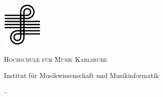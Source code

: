 
\begin{titlepage}
	\centering
	
	\includegraphics[width=0.15\textwidth]{../Grafiken/Logo_HfM_KA}\par
	
	\vspace{0.6cm}
	
	{\scshape\LARGE Hochschule für Musik Karlsruhe \par
		\vspace{0.2cm}
		\large Institut für Musikwissenschaft und Musikinformatik\par}
	\vspace{1cm}
	
	{\Large \modulname –\modulkuerzel\par}
	
	\vspace{4.5cm}
	
	{\Huge\textbf{\titel}}\par
		{\huge\textsl{\untertitelI\\}}\par
		{\huge\textsl{\untertitelII\\}}
	\vspace{4.5cm}

	{
		\textsc{\verfasser} \par
		\vspace{0.4cm}
		\adresse \par
		\email \par}
	\vspace{0.3cm}
	
	{\large \abgabedatum}
\end{titlepage}